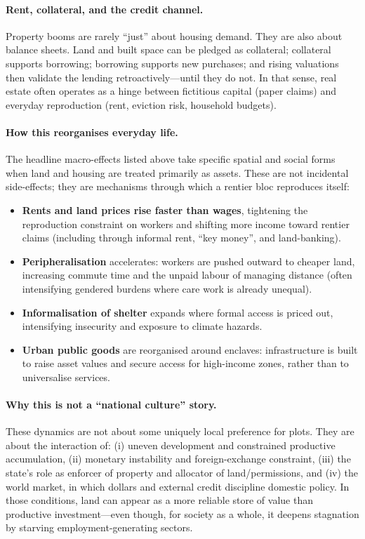 \paragraph{Rent, collateral, and the credit channel.}
Property booms are rarely ``just'' about housing demand. They are also about balance sheets.
Land and built space can be pledged as collateral; collateral supports borrowing; borrowing supports
new purchases; and rising valuations then validate the lending retroactively---until they do not.
In that sense, real estate often operates as a hinge between fictitious capital (paper claims) and
everyday reproduction (rent, eviction risk, household budgets).

\paragraph{How this reorganises everyday life.}
The headline macro-effects listed above take specific spatial and social forms when land and housing are treated
primarily as assets. These are not incidental side-effects; they are mechanisms through which a rentier bloc
reproduces itself:

\begin{itemize}[leftmargin=1.5em]
  \item \textbf{Rents and land prices rise faster than wages}, tightening the reproduction constraint on workers
  and shifting more income toward rentier claims (including through informal rent, ``key money'', and land-banking).
  \item \textbf{Peripheralisation} accelerates: workers are pushed outward to cheaper land, increasing commute time
  and the unpaid labour of managing distance (often intensifying gendered burdens where care work is already unequal).
  \item \textbf{Informalisation of shelter} expands where formal access is priced out, intensifying insecurity and
  exposure to climate hazards.
  \item \textbf{Urban public goods} are reorganised around enclaves: infrastructure is built to raise asset values
  and secure access for high-income zones, rather than to universalise services.
\end{itemize}

\paragraph{Why this is not a ``national culture'' story.}
These dynamics are not about some uniquely local preference for plots. They are about the interaction of:
(i) uneven development and constrained productive accumulation,
(ii) monetary instability and foreign-exchange constraint,
(iii) the state’s role as enforcer of property and allocator of land/permissions, and
(iv) the world market, in which dollars and external credit discipline domestic policy.
In those conditions, land can appear as a more reliable store of value than productive investment---even though,
for society as a whole, it deepens stagnation by starving employment-generating sectors.

